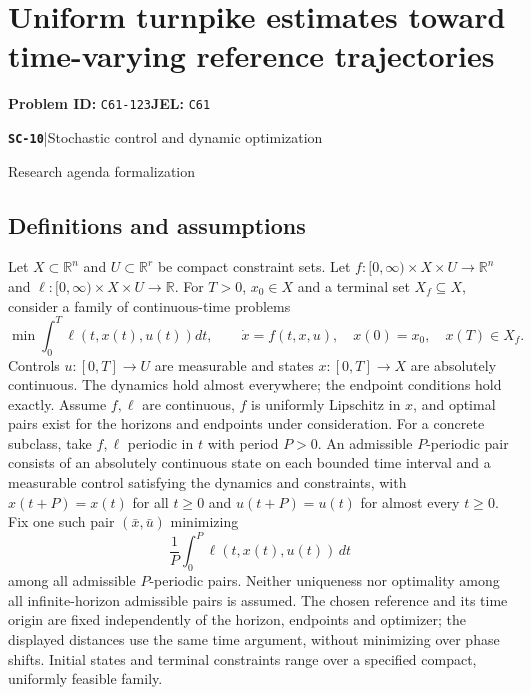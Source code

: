 \documentclass[11pt,a4paper]{article}
\newcommand{\R}{\mathbb R}
\newcommand{\entrymeta}[3]{{\sffamily\small\color{muted}\textbf{\texttt{#1}}\quad|\quad #2\par #3\par}}
\begin{document}
\section*{Uniform turnpike estimates toward time-varying reference trajectories}
\textbf{Problem ID:} \texttt{C61-123}\quad \textbf{JEL:} \texttt{C61}\par
\label{problem:OP-0571}
\label{beyond:SC-10}
\entrymeta{SC-10}{Stochastic control and dynamic optimization}{Research agenda formalization}
\subsection*{Definitions and assumptions}
Let $X\subset\R^n$ and $U\subset\R^r$ be compact constraint sets.
Let $f:[0,\infty)\times X\times U\to\R^n$ and
$\ell:[0,\infty)\times X\times U\to\R$. For $T>0$, $x_0\in X$
and a terminal set $X_f\subseteq X$, consider a family of continuous-time problems
\[
 \min\int_0^T\ell(t,x(t),u(t))dt,\qquad
 \dot x=f(t,x,u),\quad x(0)=x_0,\quad x(T)\in X_f.
\]
Controls $u:[0,T]\to U$ are measurable and states
$x:[0,T]\to X$ are absolutely continuous. The dynamics hold almost
everywhere; the endpoint conditions hold exactly. Assume $f,\ell$ are
continuous, $f$ is uniformly Lipschitz in $x$, and optimal pairs exist
for the horizons and endpoints under consideration. For a concrete subclass,
take $f,\ell$ periodic in $t$ with period $P>0$. An admissible
$P$-periodic pair consists of an absolutely continuous state on each
bounded time interval and a measurable control satisfying the dynamics
and constraints, with $x(t+P)=x(t)$ for all $t\geq0$ and
$u(t+P)=u(t)$ for almost every $t\geq0$. Fix one such pair
$(\bar x,\bar u)$ minimizing
\[
 \frac1P\int_0^P\ell(t,x(t),u(t))\,dt
\]
among all admissible $P$-periodic pairs. Neither uniqueness nor optimality
among all infinite-horizon admissible pairs is assumed. The chosen reference
and its time origin are fixed independently of the horizon, endpoints and
optimizer; the displayed distances use the same time argument, without
minimizing over phase shifts. Initial states and terminal constraints range
over a specified compact, uniformly feasible family.
\end{document}
